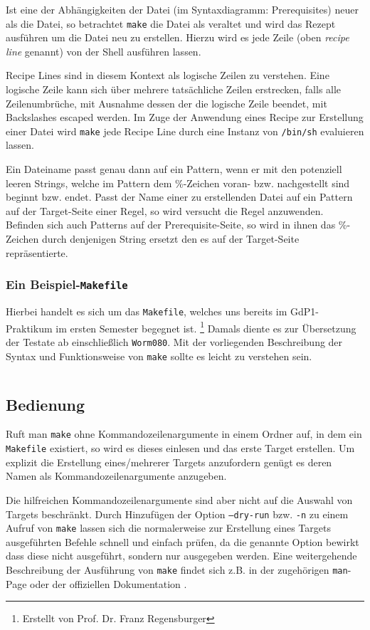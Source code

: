 		Ist eine der Abhängigkeiten der Datei (im Syntaxdiagramm: Prerequisites)
		neuer als die Datei, so betrachtet \texttt{make} die Datei als veraltet
		und wird das Rezept ausführen um die Datei neu zu erstellen. Hierzu wird
		es jede Zeile (oben \textit{recipe line} genannt) von der Shell
		ausführen lassen.

		Recipe Lines sind in diesem Kontext als logische Zeilen zu verstehen.
		Eine logische Zeile kann sich über mehrere tatsächliche Zeilen
		erstrecken, falls alle Zeilenumbrüche, mit Ausnahme dessen der die
		logische Zeile beendet, mit Backslashes escaped werden. Im Zuge der
		Anwendung eines Recipe zur Erstellung einer Datei wird \texttt{make}
		jede Recipe Line durch eine Instanz von \texttt{/bin/sh} evaluieren
		lassen.

		Ein Dateiname passt genau dann auf ein Pattern, wenn er mit den
		potenziell leeren Strings, welche im Pattern dem \%-Zeichen voran- bzw.
		nachgestellt sind beginnt bzw. endet. Passt der Name einer zu
		erstellenden Datei auf ein Pattern auf der Target-Seite einer Regel, so
		wird versucht die Regel anzuwenden.  Befinden sich auch Patterns auf der
		Prerequisite-Seite, so wird in ihnen das \%-Zeichen durch denjenigen
		String ersetzt den es auf der Target-Seite repräsentierte.

		\clearpage
		\subsubsection{Ein Beispiel-\texttt{Makefile}}
			\label{subsubsection:examplemakefile}

			Hierbei handelt es sich um das \texttt{Makefile}, welches uns
			bereits im GdP1-Praktikum im ersten Semester begegnet ist.
			\footnote{Erstellt von Prof. Dr. Franz Regensburger} Damals diente
			es zur Übersetzung der Testate ab einschließlich \texttt{Worm080}.
			Mit der vorliegenden Beschreibung der Syntax und Funktionsweise von
			\texttt{make} sollte es leicht zu verstehen sein.

			{
			\footnotesize
			\inputminted[linenos=true,stepnumber=5]{make}{../code/Worm080_Makefile}
			}
		\clearpage

\subsection{Bedienung}

	Ruft man \texttt{make} ohne Kommandozeilenargumente in einem Ordner auf, in
	dem ein \texttt{Makefile} existiert, so wird es dieses einlesen und das
	erste Target erstellen.
	Um explizit die Erstellung eines/mehrerer Targets anzufordern genügt es
	deren Namen als Kommandozeilenargumente anzugeben.

	Die hilfreichen Kommandozeilenargumente sind aber nicht auf die Auswahl von
	Targets beschränkt. Durch Hinzufügen der Option \texttt{--dry-run} bzw.
	\texttt{-n} zu einem Aufruf von \texttt{make} lassen sich die normalerweise
	zur Erstellung eines Targets ausgeführten Befehle schnell und einfach
	prüfen, da die genannte Option bewirkt dass diese nicht ausgeführt, sondern
	nur ausgegeben werden.
	Eine weitergehende Beschreibung der Ausführung von \texttt{make} findet sich
	z.B. in der zugehörigen \texttt{man}-Page oder der offiziellen Dokumentation
	.
